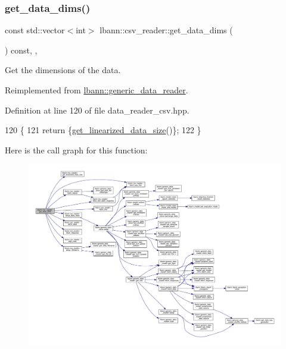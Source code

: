 \subsubsection{\texorpdfstring{get\+\_\+data\+\_\+dims()}{get\_data\_dims()}}
{\footnotesize\ttfamily const std\+::vector$<$int$>$ lbann\+::csv\+\_\+reader\+::get\+\_\+data\+\_\+dims (\begin{DoxyParamCaption}{ }\end{DoxyParamCaption}) const\hspace{0.3cm}{\ttfamily [inline]}, {\ttfamily [override]}, {\ttfamily [virtual]}}



Get the dimensions of the data. 



Reimplemented from \hyperlink{classlbann_1_1generic__data__reader_ae06ff27459ac4a5d8ac14655d4b31318}{lbann\+::generic\+\_\+data\+\_\+reader}.



Definition at line 120 of file data\+\_\+reader\+\_\+csv.\+hpp.


\begin{DoxyCode}
120                                                       \{
121     \textcolor{keywordflow}{return} \{\hyperlink{classlbann_1_1csv__reader_aa1121a406e7af9e97d82e5a945b3b957}{get\_linearized\_data\_size}()\};
122   \}
\end{DoxyCode}
Here is the call graph for this function\+:\nopagebreak
\begin{figure}[H]
\begin{center}
\leavevmode
\includegraphics[width=350pt]{classlbann_1_1csv__reader_a6fab46f562936d43d19e0eaacf8b72c0_cgraph}
\end{center}
\end{figure}
\mbox{\label{classlbann_1_1csv__reader_aa1121a406e7af9e97d82e5a945b3b957}} 
